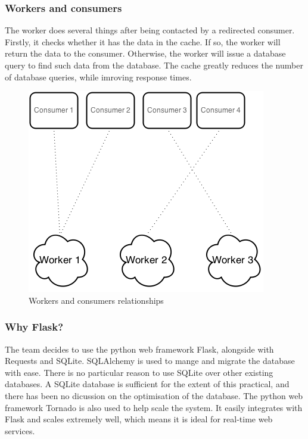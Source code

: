 \documentclass{sigchi}
\begin{document}
\subsubsection{Workers and consumers}

The worker does several things after being contacted by a redirected consumer. Firstly, it checks whether it has the data in the cache. If so, the worker will return the data to the consumer. Otherwise, the worker will issue a database query to find such data from the database. The cache greatly reduces the number of database queries, while imroving response times.

\begin{figure}[!h]
\centering
\includegraphics[width=0.9\columnwidth]{img/cons_to_worker}
\caption{Workers and consumers relationships}
\label{fig:cons_to_worker}
\end{figure}

\subsubsection{Why Flask?}

The team decides to use the python web framework Flask, alongside with Requests and SQLite. SQLAlchemy is used to mange and migrate the database with ease. There is no particular reason to use SQLite over other existing databases. A SQLite database is sufficient for the extent of this practical, and there has been no dicussion on the optimisation of the database. The python web framework Tornado is also used to help scale the system. It easily integrates with Flask and scales extremely well, which means it is ideal for real-time web services.
\end{document}
